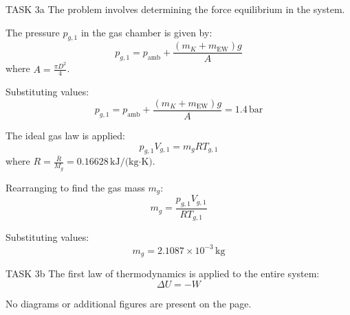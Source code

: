 TASK 3a  
The problem involves determining the force equilibrium in the system.  

The pressure \( p_{g,1} \) in the gas chamber is given by:  
\[
p_{g,1} = p_{\text{amb}} + \frac{(m_K + m_{\text{EW}}) g}{A}
\]  
where \( A = \frac{\pi D^2}{4} \).  

Substituting values:  
\[
p_{g,1} = p_{\text{amb}} + \frac{(m_K + m_{\text{EW}}) g}{A} = 1.4 \, \text{bar}
\]  

The ideal gas law is applied:  
\[
p_{g,1} V_{g,1} = m_g R T_{g,1}
\]  
where \( R = \frac{\bar{R}}{M_g} = 0.16628 \, \text{kJ/(kg·K)} \).  

Rearranging to find the gas mass \( m_g \):  
\[
m_g = \frac{p_{g,1} V_{g,1}}{R T_{g,1}}
\]  

Substituting values:  
\[
m_g = 2.1087 \times 10^{-3} \, \text{kg}
\]  

TASK 3b  
The first law of thermodynamics is applied to the entire system:  
\[
\Delta U = -W
\]  

No diagrams or additional figures are present on the page.